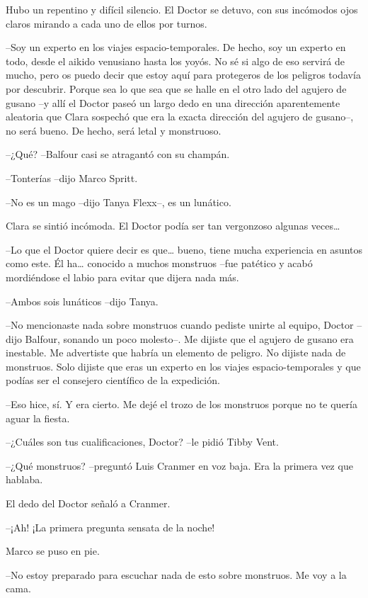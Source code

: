 {Hubo un repentino y difícil silencio. El Doctor se detuvo, con sus
incómodos ojos claros mirando a cada uno de ellos por turnos.}

{--Soy un experto en los viajes espacio-temporales. De hecho, soy un
 experto en todo, desde el aikido venusiano hasta los yoyós. No sé si
 algo de eso servirá de mucho, pero os puedo decir que estoy aquí para
 protegeros de los peligros todavía por descubrir. Porque sea lo que sea
 que se halle en el otro lado del agujero de gusano --y allí el Doctor
 paseó un largo dedo en una dirección aparentemente aleatoria que Clara
 sospechó que era la exacta dirección del agujero de gusano--, no será
bueno. De hecho, será letal y monstruoso.}

{--¿Qué? --Balfour casi se atragantó con su champán.}

{--Tonterías --dijo Marco Spritt.}

{--No es un mago --dijo Tanya Flexx--, es un lunático.}

{Clara se sintió incómoda. El Doctor podía ser tan vergonzoso algunas
 veces\ldots{}}

{--Lo que el Doctor quiere decir es que\ldots{} bueno, tiene mucha
 experiencia en asuntos como este. Él ha\ldots{} conocido a muchos
 monstruos --fue patético y acabó mordiéndose el labio para evitar que
dijera nada más.}

{--Ambos sois lunáticos --dijo Tanya.}

{--No mencionaste nada sobre monstruos cuando pediste unirte al equipo,
 Doctor --dijo Balfour, sonando un poco molesto--. Me dijiste que el
 agujero de gusano era inestable. Me advertiste que habría un elemento de
 peligro. No dijiste nada de monstruos. Solo dijiste que eras un experto
 en los viajes espacio-temporales y que podías ser el consejero
científico de la expedición.}

{--Eso hice, sí. Y era cierto. Me dejé el trozo de los monstruos porque
no te quería aguar la fiesta.}

{--¿Cuáles son tus cualificaciones, Doctor? --le pidió Tibby Vent.}

{--¿Qué monstruos? --preguntó Luis Cranmer en voz baja. Era la primera
vez que hablaba.}

{El dedo del Doctor señaló a Cranmer.}

{--¡Ah! ¡La primera pregunta sensata de la noche!}

{Marco se puso en pie.}

{--No estoy preparado para escuchar nada de esto sobre monstruos. Me voy
a la cama.}


